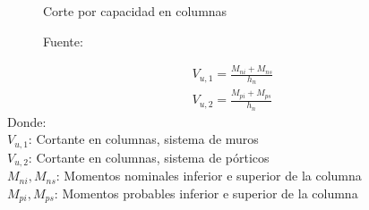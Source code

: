 \begin{figure}[ht!]
    \centering
    \caption{Corte por capacidad en columnas}
    \hspace{0mm}
    \caption*{\small Fuente: \it \cite{E-060}}
    \label{reqv}
\end{figure}
\begin{align}
V_{u,1}=\frac{M_{n i}+M_{n s}}{h_{n}}\label{vcap1}\\
V_{u,2}=\frac{M_{p i}+M_{p s}}{h_{n}}\label{vcap2}
\end{align}
\newpage
\noindent
Donde:\\
$V_{u,1}$: Cortante en columnas, sistema de muros\\
$V_{u,2}$: Cortante en columnas, sistema de pórticos\\
$M_{n i}, M_{n s}$: Momentos nominales inferior e superior de la columna\\
$M_{p i}, M_{p s}$: Momentos probables inferior e superior de la columna\\

